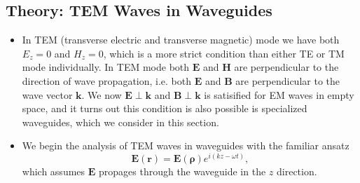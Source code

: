 \documentclass[11pt, a4paper]{article}
\renewcommand{\vec}[1]{\bm{#1}} %
\renewcommand{\r}{\vec{r}}
\newcommand{\rh}{\vec{\rho}}
\newcommand{\E}{\vec{E}}  %
\newcommand{\B}{\vec{B}}  %
\renewcommand{\H}{\vec{H}}  %
\begin{document}
\subsection{Theory: TEM Waves in Waveguides}
\begin{itemize}
    \item In TEM (transverse electric and transverse magnetic) mode we have both $ E_{z} = 0 $ and $ H_{z} = 0 $, which is a more strict condition than either TE or TM mode individually. In TEM mode both $ \E $ and $ \H $ are perpendicular to the direction of wave propagation, i.e. both $ \E $ and $ \B $ are perpendicular to the wave vector $ \vec{k} $. We now $ \E \perp \vec{k} $ and $ \B \perp \vec{k} $ is satisified for EM waves in empty space, and it turns out this condition is also possible is specialized waveguides, which we consider in this section.
	
	\item We begin the analysis of TEM waves in waveguides with the familiar ansatz
	\begin{equation*}
		\E(\r) = \E(\vec{\rh})e^{i(kz - \omega t)},
	\end{equation*}
    which assumes $ \E $ propages through the waveguide in the $ z $ direction. 
\end{itemize}
\end{document}

